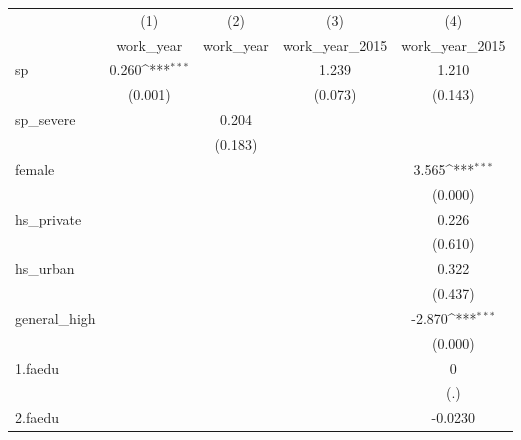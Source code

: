 {
\def\sym#1{\ifmmode^{#1}\else\(^{#1}\)\fi}
\begin{tabular}{l*{4}{c}}
\hline\hline
            &\multicolumn{1}{c}{(1)}&\multicolumn{1}{c}{(2)}&\multicolumn{1}{c}{(3)}&\multicolumn{1}{c}{(4)}\\
            &\multicolumn{1}{c}{work\_year}&\multicolumn{1}{c}{work\_year}&\multicolumn{1}{c}{work\_year\_2015}&\multicolumn{1}{c}{work\_year\_2015}\\
\hline
sp          &       0.260\sym{***}&                     &       1.239         &       1.210         \\
            &     (0.001)         &                     &     (0.073)         &     (0.143)         \\
[1em]
sp\_severe   &                     &       0.204         &                     &                     \\
            &                     &     (0.183)         &                     &                     \\
[1em]
female      &                     &                     &                     &       3.565\sym{***}\\
            &                     &                     &                     &     (0.000)         \\
[1em]
hs\_private  &                     &                     &                     &       0.226         \\
            &                     &                     &                     &     (0.610)         \\
[1em]
hs\_urban    &                     &                     &                     &       0.322         \\
            &                     &                     &                     &     (0.437)         \\
[1em]
general\_high&                     &                     &                     &      -2.870\sym{***}\\
            &                     &                     &                     &     (0.000)         \\
[1em]
1.faedu     &                     &                     &                     &           0         \\
            &                     &                     &                     &         (.)         \\
[1em]
2.faedu     &                     &                     &                     &     -0.0230         \\

\end{tabular}}
